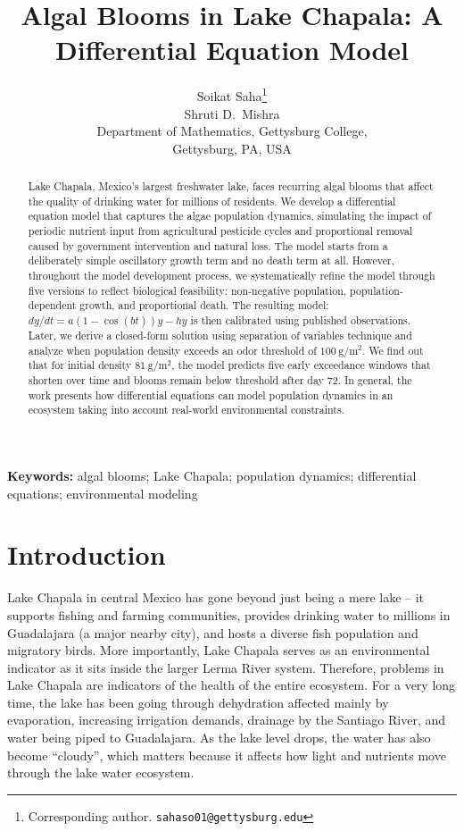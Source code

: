 \documentclass[11pt]{article}
\title{Algal Blooms in Lake Chapala: A Differential Equation Model}
\author{Soikat Saha\thanks{Corresponding author. \texttt{sahaso01@gettysburg.edu}} \\
        Shruti D.~Mishra \\
        \small Department of Mathematics, Gettysburg College, \\ 
        \small Gettysburg, PA, USA}
\date{}
\begin{document}
\maketitle

\begin{abstract}
Lake Chapala, Mexico's largest freshwater lake, faces recurring algal blooms that affect the quality of drinking water for millions of residents. We develop a differential equation model that captures the algae population dynamics, simulating the impact of periodic nutrient input from agricultural pesticide cycles and proportional removal caused by government intervention and natural loss. The model starts from a deliberately simple oscillatory growth term and no death term at all. However, throughout the model development process, we systematically refine the model through five versions to reflect biological feasibility: non-negative population, population-dependent growth, and proportional death. The resulting model: $dy/dt = a(1-\cos(bt))y - hy$ is then calibrated using published observations. Later, we derive a closed-form solution using separation of variables technique and analyze when population density exceeds an odor threshold of $100~\mathrm{g/m^2}$. We find out that for initial density $81~\mathrm{g/m^2}$, the model predicts five early exceedance windows that shorten over time and blooms remain below threshold after day 72. In general, the work presents how differential equations can model population dynamics in an ecosystem taking into account real-world environmental constraints.
\end{abstract}

\noindent\textbf{Keywords:} algal blooms; Lake Chapala; population dynamics; differential equations; environmental modeling

\section{Introduction}

Lake Chapala in central Mexico has gone beyond just being a mere lake – it supports fishing and farming communities, provides drinking water to millions in Guadalajara (a major nearby city), and hosts a diverse fish population and migratory birds. More importantly, Lake Chapala serves as an environmental indicator as it sits inside the larger Lerma River system. Therefore, problems in Lake Chapala are indicators of the health of the entire ecosystem. For a very long time, the lake has been going through dehydration affected mainly by evaporation, increasing irrigation demands, drainage by the Santiago River, and water being piped to Guadalajara. As the lake level drops, the water has also become ``cloudy'', which matters because it affects how light and nutrients move through the lake water ecosystem.
\end{document}
